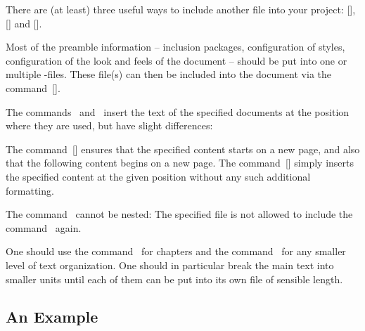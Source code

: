 There are (at least) three useful ways to include another file into your project: [\comname], [\comname] and [\comname].
\begin{myitemize}
  \item
    Most of the preamble information -- inclusion packages, configuration of styles, configuration of the look and feels of the document -- should be put into one or multiple -files.
    These file(s) can then be included into the document via the command~[\comname].
  \item
    The commands~ and~ insert the text of the specified documents at the position where they are used, but have slight differences:
    \begin{myitemize}
      \item
        The command~[\comname] ensures that the specified content starts on a new page, and also that the following content begins on a new page.
        The command~[\comname] simply inserts the specified content at the given position without any such additional formatting.
      \item
        The command~ cannot be nested:
        The specified file is not allowed to include the command~ again.
    \end{myitemize}
\end{myitemize}

One should use the command~ for chapters and the command~ for any smaller level of text organization.
One should in particular break the main text into smaller units until each of them can be put into its own file of sensible length.



\subsection{An Example}

